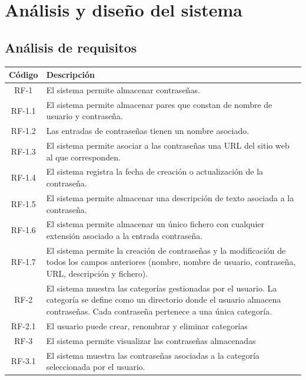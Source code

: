 \documentclass{article}
\begin{document}
\section{Análisis y diseño del sistema}

\subsection{Análisis de requisitos}

\begin{table}[H]
    \centering
    \begin{tabular}{| c | p{30em} |}
    \hline
        Código &  Descripción  \\ \hline
        RF-1 & El sistema permite almacenar contraseñas. \\ \hline
        RF-1.1 & El sistema permite almacenar pares que constan de nombre de usuario y contraseña.  \\ \hline
        RF-1.2 & Las entradas de contraseñas tienen un nombre asociado. \\ \hline
        RF-1.3 & El sistema permite asociar a las contraseñas una URL del sitio web al que corresponden. \\ \hline
        RF-1.4 & El sistema registra la fecha de creación o actualización de la contraseña. \\ \hline
        RF-1.5 & El sistema permite almacenar una descripción de texto asociada a la contraseña. \\ \hline
        RF-1.6 & El sistema permite almacenar un único fichero con cualquier extensión asociado a la entrada contraseña. \\ \hline
        RF-1.7 & El sistema permite la creación de contraseñas y la modificación de todos los campos anteriores (nombre, nombre de usuario, contraseña, URL, descripción y fichero). \\ \hline
        RF-2 & El sistema muestra las categorías gestionadas por el usuario. La categoría se define como un directorio donde el usuario almacena contraseñas. Cada contraseña pertenece a una única categoría.\\ \hline
        RF-2.1 & El usuario puede crear, renombrar y eliminar categorías \\ \hline
        RF-3 & El sistema permite visualizar las contraseñas almacenadas\\ \hline
        RF-3.1 & El sistema muestra las contraseñas asociadas a la categoría seleccionada por el usuario. \\ \hline

\end{tabular}
\end{table}
\end{document}
